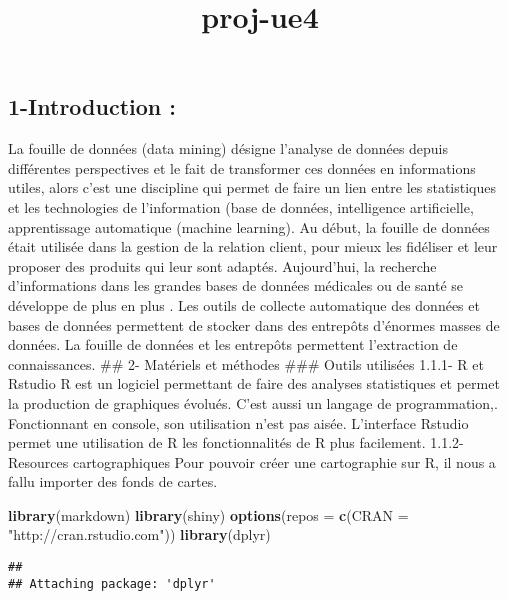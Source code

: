 \documentclass[]{article}
\title{proj-ue4}
\author{}
\date{}
\newenvironment{Shaded}{\begin{snugshade}}{\end{snugshade}}
\newcommand{\KeywordTok}[1]{\textcolor[rgb]{0.13,0.29,0.53}{\textbf{#1}}}
\newcommand{\DataTypeTok}[1]{\textcolor[rgb]{0.13,0.29,0.53}{#1}}
\newcommand{\StringTok}[1]{\textcolor[rgb]{0.31,0.60,0.02}{#1}}
\newcommand{\NormalTok}[1]{#1}
\begin{document}
\maketitle

\subsection{1-Introduction :}\label{introduction}

La fouille de données (data mining) désigne l'analyse de données depuis
différentes perspectives et le fait de transformer ces données en
informations utiles, alors c'est une discipline qui permet de faire un
lien entre les statistiques et les technologies de l'information (base
de données, intelligence artificielle, apprentissage automatique
(machine learning). Au début, la fouille de données était utilisée dans
la gestion de la relation client, pour mieux les fidéliser et leur
proposer des produits qui leur sont adaptés. Aujourd'hui, la recherche
d'informations dans les grandes bases de données médicales ou de santé
se développe de plus en plus . Les outils de collecte automatique des
données et bases de données permettent de stocker dans des entrepôts
d'énormes masses de données. La fouille de données et les entrepôts
permettent l'extraction de connaissances. \#\# 2- Matériels et méthodes
\#\#\# Outils utilisées 1.1.1- R et Rstudio R est un logiciel permettant
de faire des analyses statistiques et permet la production de graphiques
évolués. C'est aussi un langage de programmation,. Fonctionnant en
console, son utilisation n'est pas aisée. L'interface Rstudio permet une
utilisation de R les fonctionnalités de R plus facilement. 1.1.2-
Resources cartographiques Pour pouvoir créer une cartographie sur R, il
nous a fallu importer des fonds de cartes.

\begin{Shaded}
\begin{Highlighting}[]
\KeywordTok{library}\NormalTok{(markdown)}
\KeywordTok{library}\NormalTok{(shiny)}
\KeywordTok{options}\NormalTok{(}\DataTypeTok{repos =} \KeywordTok{c}\NormalTok{(}\DataTypeTok{CRAN =} \StringTok{"http://cran.rstudio.com"}\NormalTok{))}
\KeywordTok{library}\NormalTok{(dplyr)}
\end{Highlighting}
\end{Shaded}

\begin{verbatim}
## 
## Attaching package: 'dplyr'
\end{verbatim}
\end{document}
